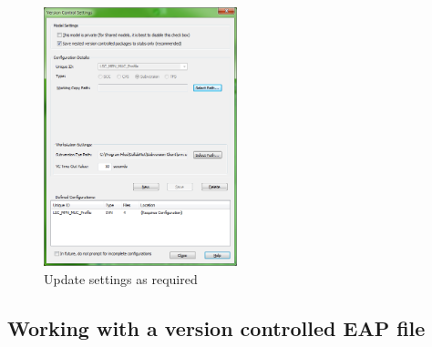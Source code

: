 \begin{enumerate}
\begin{figure}[!htbp]
\begin{center}
	\includegraphics[width=0.5\textwidth]{pics/advancedTopics/eaSVN/DemoLanguages/012}
	\caption{Update settings as required}
  	\label{fig:advanced-topics-eaSVN-setWorkingCopyPath}
\end{center}
\end{figure}

\end{enumerate}
 
\subsection{Working with a version controlled EAP file}
\label{sect:appendixB_update_commit}

